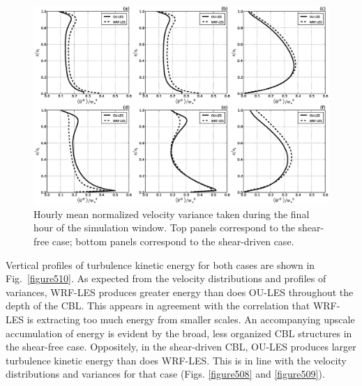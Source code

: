 \begin{figure}[!ht]
\begin{center}
\includegraphics[width=\textwidth]{figures/chapter5/velocity_variance}
\end{center}
\caption{Hourly mean normalized velocity variance taken during the final hour of the simulation window. Top panels correspond to the shear-free case; bottom panels correspond to the shear-driven case.}
\label{figure509}
\end{figure}


Vertical profiles of turbulence kinetic energy for both cases are shown in Fig.~\ref{figure510}. As expected from the velocity distributions and profiles of variances, WRF-LES produces greater energy than does OU-LES throughout the depth of the CBL. This appears in agreement with the correlation that WRF-LES is extracting too much energy from smaller scales. An accompanying upscale accumulation of energy is evident by the broad, less organized CBL structures in the shear-free case. Oppositely, in the shear-driven CBL, OU-LES produces larger turbulence kinetic energy than does WRF-LES. This is in line with the velocity distributions and variances for that case (Figs. \autoref{figure508} and \autoref{figure509}). 


